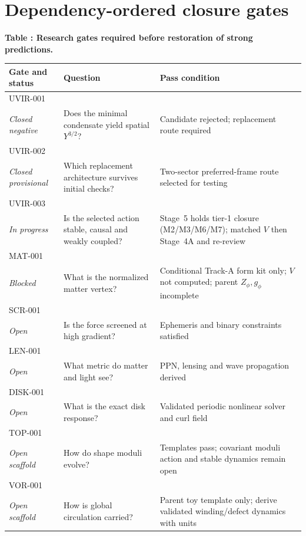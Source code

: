 \clearpage
\section{Dependency-ordered closure gates}

\begin{center}
\small
\textbf{Table \thetable: Research gates required before restoration of strong predictions.}\par\smallskip
\begin{tabular}{@{}p{}p{}p{}@{}}
\toprule
Gate and status & Question & Pass condition \\
\midrule
UVIR-001\\\textit{Closed negative} & Does the minimal condensate yield spatial $Y^{3/2}$? & Candidate rejected; replacement route required \\
UVIR-002\\\textit{Closed provisional} & Which replacement architecture survives initial checks? & Two-sector preferred-frame route selected for testing \\
UVIR-003\\\textit{In progress} & Is the selected action stable, causal and weakly coupled? & Stage~5 holds tier-1 closure (M2/M3/M6/M7); matched $V$ then Stage~4A and re-review \\
MAT-001\\\textit{Blocked} & What is the normalized matter vertex? & Conditional Track-A form kit only; $V$ not computed; parent $Z_\phi,g_\phi$ incomplete \\
SCR-001\\\textit{Open} & Is the force screened at high gradient? & Ephemeris and binary constraints satisfied \\
LEN-001\\\textit{Open} & What metric do matter and light see? & PPN, lensing and wave propagation derived \\
DISK-001\\\textit{Open} & What is the exact disk response? & Validated periodic nonlinear solver and curl field \\
TOP-001\\\textit{Open scaffold} & How do shape moduli evolve? & Templates pass; covariant moduli action and stable dynamics remain open \\
VOR-001\\\textit{Open scaffold} & How is global circulation carried? & Parent toy template only; derive validated winding/defect dynamics with units \\

\end{tabular}
\end{center}
